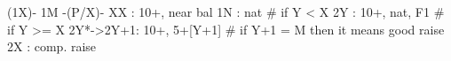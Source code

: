 (1X)- 1M -(P/X)- 
XX : 10+, near bal
1N : nat
# if Y < X
2Y : 10+, nat, F1
# if Y >= X
2Y*->2Y+1: 10+, 5+[Y+1]  # if Y+1 = M then it means good raise
2X : comp. raise